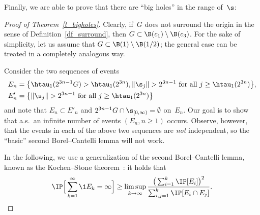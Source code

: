 Finally, we are able to prove that there are ``big holes'' in the range of~$\s$:
\begin{proof}[Proof of Theorem~\ref{t_bigholes}]
Clearly, if~$G$ does not surround the origin in the sense of Definition~\ref{df_surround}, then $G\subset \B(c_1)\setminus \B(c_3)$. For the sake of simplicity, let us assume that $G\subset\B(1)\setminus \B(1/2)$; the general case can be treated in a completely analogous way.

Consider the two sequences of events
\begin{align*}
E_n &= \big\{\htau_1(2^{3n-1}G)>\htau_1(2^{3n}),
\|\s_j\| > 2^{3n-1} \text{ for all } j\geq \htau_1(2^{3n})\big\},\\
E'_n &= \big\{
\|\s_j\| > 2^{3n-1} \text{ for all } j\geq \htau_1(2^{3n})\big\}
\end{align*}
and note that $E_n\subset E'_n$ and $2^{3n-1}G\cap \s_{[0,\infty)}=\emptyset$ on~$E_n$. Our goal is to show that a.s.\ an infinite number of events $(E_n, n\geq 1)$ occurs. Observe, however, that the events in each of the above two sequences are \emph{not} independent, so the ``basic'' second Borel--Cantelli lemma will not work.

In the following, we use a generalization of the second Borel--Cantelli lemma, known as the Kochen--Stone theorem~\cite{KS64}: it holds that
\begin{equation}\label{Kochen--Stone}
\IP\Big[\sum_{k=1}^\infty \1{E_k}=\infty\Big] \geq
\limsup_{k\to\infty} \frac{\big(\sum_{i=1}^k\IP[E_i]\big)^2} {\sum_{i,j=1}^k\IP[E_i\cap E_j]}.
\end{equation}


\end{proof}
